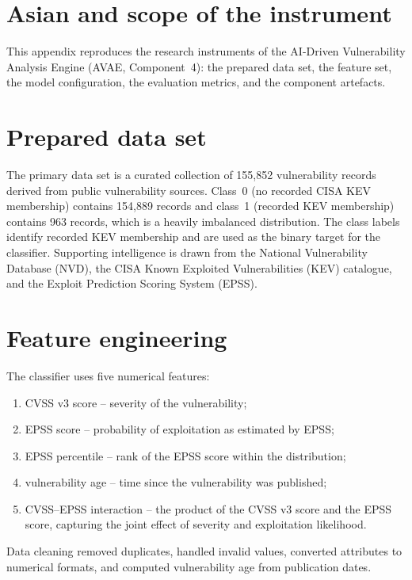 \section{Asian and scope of the instrument}

This appendix reproduces the research instruments of the AI-Driven Vulnerability
Analysis Engine (AVAE, Component~4): the prepared data set, the feature set, the
model configuration, the evaluation metrics, and the component artefacts.

\section{Prepared data set}

The primary data set is a curated collection of 155,852 vulnerability records
derived from public vulnerability sources. Class~0 (no recorded CISA KEV
membership) contains 154,889 records and class~1 (recorded KEV membership)
contains 963 records, which is a heavily imbalanced distribution. The class
labels identify recorded KEV membership and are used as the binary target for
the classifier. Supporting intelligence is drawn from the National
Vulnerability Database (NVD), the CISA Known Exploited Vulnerabilities (KEV)
catalogue, and the Exploit Prediction Scoring System (EPSS).

\section{Feature engineering}

The classifier uses five numerical features:

\begin{enumerate}
  \item CVSS v3 score -- severity of the vulnerability;
  \item EPSS score -- probability of exploitation as estimated by EPSS;
  \item EPSS percentile -- rank of the EPSS score within the distribution;
  \item vulnerability age -- time since the vulnerability was published;
  \item CVSS--EPSS interaction -- the product of the CVSS v3 score and the EPSS
  score, capturing the joint effect of severity and exploitation likelihood.
\end{enumerate}

Data cleaning removed duplicates, handled invalid values, converted attributes
to numerical formats, and computed vulnerability age from publication dates.


